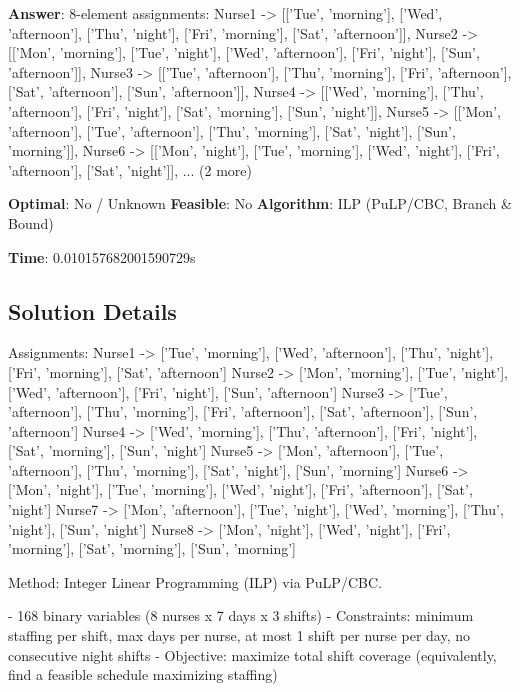 \documentclass[11pt, a4paper]{article}
\begin{document}
\begin{polyaresult}

\textbf{Answer}: 8-element assignments: Nurse1 -> [['Tue', 'morning'], ['Wed', 'afternoon'], ['Thu', 'night'], ['Fri', 'morning'], ['Sat', 'afternoon']], Nurse2 -> [['Mon', 'morning'], ['Tue', 'night'], ['Wed', 'afternoon'], ['Fri', 'night'], ['Sun', 'afternoon']], Nurse3 -> [['Tue', 'afternoon'], ['Thu', 'morning'], ['Fri', 'afternoon'], ['Sat', 'afternoon'], ['Sun', 'afternoon']], Nurse4 -> [['Wed', 'morning'], ['Thu', 'afternoon'], ['Fri', 'night'], ['Sat', 'morning'], ['Sun', 'night']], Nurse5 -> [['Mon', 'afternoon'], ['Tue', 'afternoon'], ['Thu', 'morning'], ['Sat', 'night'], ['Sun', 'morning']], Nurse6 -> [['Mon', 'night'], ['Tue', 'morning'], ['Wed', 'night'], ['Fri', 'afternoon'], ['Sat', 'night']], ... (2 more)


\textbf{Optimal}: No / Unknown \hfill
\textbf{Feasible}: No
\textbf{Algorithm}: ILP (PuLP/CBC, Branch \& Bound) \quad $$

\textbf{Time}: 0.010157682001590729s


\end{polyaresult}

\subsection{Solution Details}

Assignments:
  Nurse1 -> ['Tue', 'morning'], ['Wed', 'afternoon'], ['Thu', 'night'], ['Fri', 'morning'], ['Sat', 'afternoon']
  Nurse2 -> ['Mon', 'morning'], ['Tue', 'night'], ['Wed', 'afternoon'], ['Fri', 'night'], ['Sun', 'afternoon']
  Nurse3 -> ['Tue', 'afternoon'], ['Thu', 'morning'], ['Fri', 'afternoon'], ['Sat', 'afternoon'], ['Sun', 'afternoon']
  Nurse4 -> ['Wed', 'morning'], ['Thu', 'afternoon'], ['Fri', 'night'], ['Sat', 'morning'], ['Sun', 'night']
  Nurse5 -> ['Mon', 'afternoon'], ['Tue', 'afternoon'], ['Thu', 'morning'], ['Sat', 'night'], ['Sun', 'morning']
  Nurse6 -> ['Mon', 'night'], ['Tue', 'morning'], ['Wed', 'night'], ['Fri', 'afternoon'], ['Sat', 'night']
  Nurse7 -> ['Mon', 'afternoon'], ['Tue', 'night'], ['Wed', 'morning'], ['Thu', 'night'], ['Sun', 'night']
  Nurse8 -> ['Mon', 'night'], ['Wed', 'night'], ['Fri', 'morning'], ['Sat', 'morning'], ['Sun', 'morning']

Method: Integer Linear Programming (ILP) via PuLP/CBC.

- 168 binary variables (8 nurses x 7 days x 3 shifts)
- Constraints: minimum staffing per shift, max days per nurse, at most 1 shift per nurse per day, no consecutive night shifts
- Objective: maximize total shift coverage (equivalently, find a feasible schedule maximizing staffing)
\end{document}
